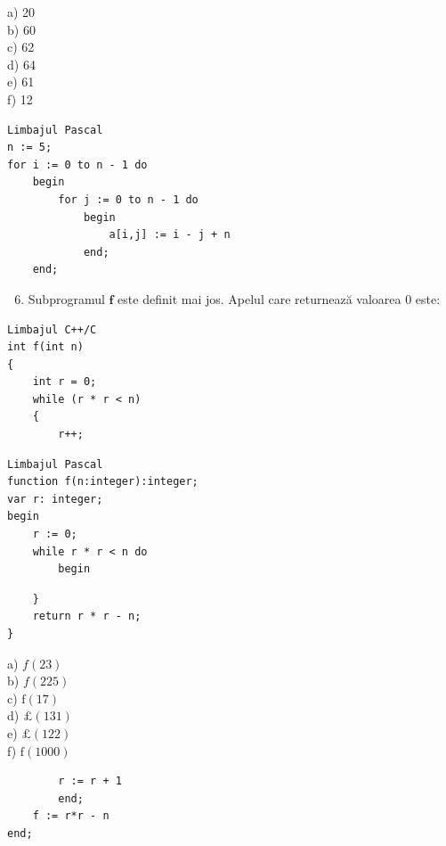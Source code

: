 \documentclass[10pt]{article}
\begin{document}
a) 20\\
b) 60\\
c) 62\\
d) 64\\
e) 61\\
f) 12

\begin{verbatim}
Limbajul Pascal
n := 5;
for i := 0 to n - 1 do
    begin
        for j := 0 to n - 1 do
            begin
                a[i,j] := i - j + n
            end;
    end;
\end{verbatim}

\begin{enumerate}
  \setcounter{enumi}{5}
  \item Subprogramul $\mathbf{f}$ este definit mai jos. Apelul care returnează valoarea 0 este:
\end{enumerate}

\begin{verbatim}
Limbajul C++/C
int f(int n)
{
    int r = 0;
    while (r * r < n)
    {
        r++;
\end{verbatim}

\begin{verbatim}
Limbajul Pascal
function f(n:integer):integer;
var r: integer;
begin
    r := 0;
    while r * r < n do
        begin
\end{verbatim}

\begin{verbatim}
    }
    return r * r - n;
}
\end{verbatim}

a) $f(23)$\\
b) $f(225)$\\
c) $\mathrm{f}(17)$\\
d) $\pounds(131)$\\
e) $\pounds(122)$\\
f) $\mathrm{f}(1000)$

\begin{verbatim}
        r := r + 1
        end;
    f := r*r - n
end;
\end{verbatim}
\end{document}
